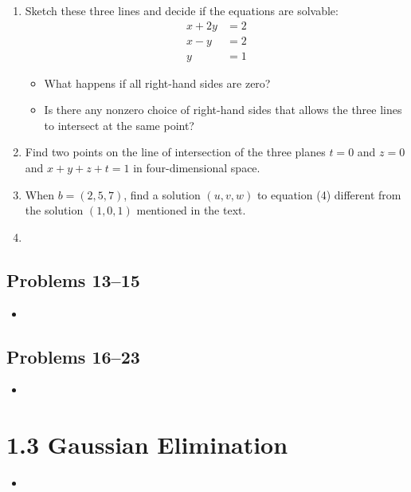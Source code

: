 \begin{itemize}
\begin{enumerate}
    \item Sketch these three lines and decide if the equations are solvable:
      \begin{align*}
        x + 2y &= 2 \\
        x - y &= 2 \\
        y &= 1
      \end{align*}
      \begin{itemize}
        \item What happens if all right-hand sides are zero?
        \item Is there any nonzero choice of right-hand sides that allows the
          three lines to intersect at the same point?
      \end{itemize}

    \item Find two points on the line of intersection of the three planes \( t
      = 0 \) and \( z = 0 \) and \( x+y+z+t = 1 \) in four-dimensional space.

    \item When \( b = (2,5,7) \), find a solution \( (u,v,w) \) to equation (4)
      different from the solution \( (1,0,1) \) mentioned in the text.

    \item






  \end{enumerate}

  \subsection{Problems 13--15}
  \begin{itemize}
    \item
  \end{itemize}

  \subsection{Problems 16--23}
  \begin{itemize}
    \item
  \end{itemize}

\end{itemize}

\section{1.3 Gaussian Elimination}
\begin{itemize}
  \item []

\end{itemize}

